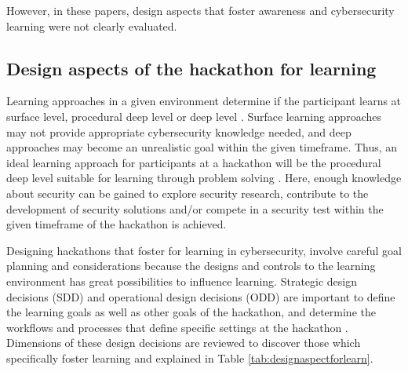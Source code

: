 \documentclass[runningheads]{llncs}
\begin{document}
However, in these papers, design aspects that foster awareness and cybersecurity learning were not clearly evaluated. %



\subsection{Design aspects of the hackathon for learning}
Learning approaches in a given environment determine if the participant learns at surface level, procedural deep level or deep level \cite{case2004between,marton1997approaches}. Surface learning approaches may not provide appropriate cybersecurity knowledge needed, and deep approaches may become an unrealistic goal within the given timeframe. Thus, an ideal learning approach for participants at a hackathon will be the procedural deep level suitable for learning through problem solving \cite{case2004between}. Here, enough knowledge about security can be gained to explore security research, contribute to the development of security solutions and/or compete in a security test within the given timeframe of the hackathon is achieved.

Designing hackathons that foster for learning in cybersecurity, involve careful goal planning and considerations because the designs and controls to the learning environment has great possibilities to influence learning. Strategic design decisions (SDD) and operational design decisions (ODD) are important to define the learning goals as well as other goals of the hackathon, and determine the workflows and processes that define specific settings at the hackathon \cite{kollwitz2019hack}. Dimensions of these design decisions are reviewed to discover those which specifically foster learning and explained in Table \ref{tab:designaspectforlearn}. 

\end{document}
